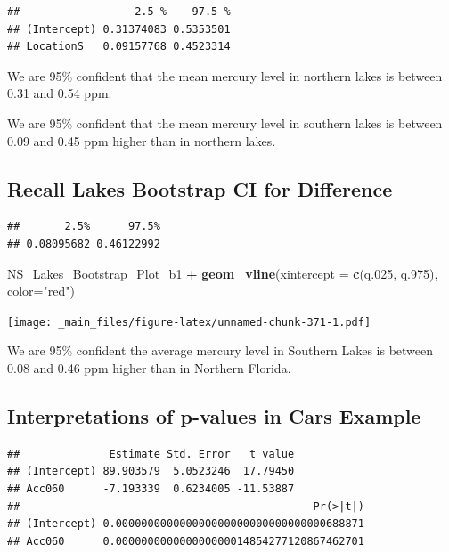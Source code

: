 \documentclass[]{book}
\newenvironment{Shaded}{\begin{snugshade}}{\end{snugshade}}
\newcommand{\KeywordTok}[1]{\textcolor[rgb]{0.13,0.29,0.53}{\textbf{#1}}}
\newcommand{\DataTypeTok}[1]{\textcolor[rgb]{0.13,0.29,0.53}{#1}}
\newcommand{\DecValTok}[1]{\textcolor[rgb]{0.00,0.00,0.81}{#1}}
\newcommand{\StringTok}[1]{\textcolor[rgb]{0.31,0.60,0.02}{#1}}
\newcommand{\OperatorTok}[1]{\textcolor[rgb]{0.81,0.36,0.00}{\textbf{#1}}}
\newcommand{\NormalTok}[1]{#1}
\begin{document}
\begin{verbatim}
##                  2.5 %    97.5 %
## (Intercept) 0.31374083 0.5353501
## LocationS   0.09157768 0.4523314
\end{verbatim}

We are 95\% confident that the mean mercury level in northern lakes is
between 0.31 and 0.54 ppm.

We are 95\% confident that the mean mercury level in southern lakes is
between 0.09 and 0.45 ppm higher than in northern lakes.

\subsection{Recall Lakes Bootstrap CI for
Difference}\label{recall-lakes-bootstrap-ci-for-difference}

\begin{verbatim}
##       2.5%      97.5% 
## 0.08095682 0.46122992
\end{verbatim}

\begin{Shaded}
\begin{Highlighting}[]
\NormalTok{NS_Lakes_Bootstrap_Plot_b1 }\OperatorTok{+}\StringTok{ }\KeywordTok{geom_vline}\NormalTok{(}\DataTypeTok{xintercept =} \KeywordTok{c}\NormalTok{(q.}\DecValTok{025}\NormalTok{, q.}\DecValTok{975}\NormalTok{), }\DataTypeTok{color=}\StringTok{"red"}\NormalTok{)}
\end{Highlighting}
\end{Shaded}

\texttt{[image: \_main\_files/figure-latex/unnamed-chunk-371-1.pdf]}

We are 95\% confident the average mercury level in Southern Lakes is
between 0.08 and 0.46 ppm higher than in Northern Florida.

\subsection{Interpretations of p-values in Cars
Example}\label{interpretations-of-p-values-in-cars-example}

\begin{Shaded}
\end{Shaded}

\begin{verbatim}
##              Estimate Std. Error   t value
## (Intercept) 89.903579  5.0523246  17.79450
## Acc060      -7.193339  0.6234005 -11.53887
##                                              Pr(>|t|)
## (Intercept) 0.000000000000000000000000000000000688871
## Acc060      0.000000000000000000014854277120867462701
\end{verbatim}
\end{document}
